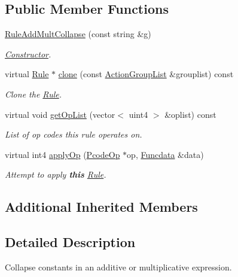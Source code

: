 \subsection*{Public Member Functions}
\begin{DoxyCompactItemize}
\item 
\mbox{\hyperlink{class_rule_add_mult_collapse_a93b4e7fcaa8b74044b67b93766a7888f}{Rule\+Add\+Mult\+Collapse}} (const string \&g)
\begin{DoxyCompactList}\small\item\em \mbox{\hyperlink{class_constructor}{Constructor}}. \end{DoxyCompactList}\item 
virtual \mbox{\hyperlink{class_rule}{Rule}} $\ast$ \mbox{\hyperlink{class_rule_add_mult_collapse_a954a3e869a8c8946773f189d02482182}{clone}} (const \mbox{\hyperlink{class_action_group_list}{Action\+Group\+List}} \&grouplist) const
\begin{DoxyCompactList}\small\item\em Clone the \mbox{\hyperlink{class_rule}{Rule}}. \end{DoxyCompactList}\item 
virtual void \mbox{\hyperlink{class_rule_add_mult_collapse_a8398a59703c4741d98bf0e488c7fb4bb}{get\+Op\+List}} (vector$<$ uint4 $>$ \&oplist) const
\begin{DoxyCompactList}\small\item\em List of op codes this rule operates on. \end{DoxyCompactList}\item 
virtual int4 \mbox{\hyperlink{class_rule_add_mult_collapse_a6f9afdaabcba06d6a739e7ff9a148fc3}{apply\+Op}} (\mbox{\hyperlink{class_pcode_op}{Pcode\+Op}} $\ast$op, \mbox{\hyperlink{class_funcdata}{Funcdata}} \&data)
\begin{DoxyCompactList}\small\item\em Attempt to apply {\bfseries{this}} \mbox{\hyperlink{class_rule}{Rule}}. \end{DoxyCompactList}\end{DoxyCompactItemize}
\subsection*{Additional Inherited Members}


\subsection{Detailed Description}
Collapse constants in an additive or multiplicative expression. 

